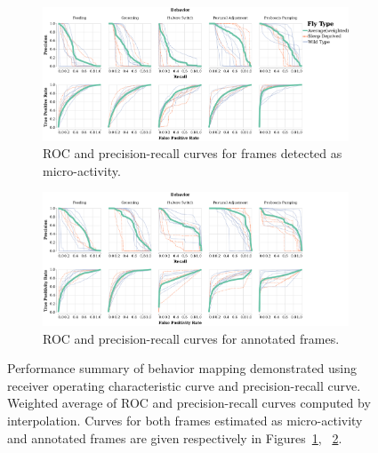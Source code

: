 \begin{figure}[htb!]
	\centering
	\begin{subfigure}[b]{0.99\linewidth}
		\centering\includegraphics[width=\linewidth]{figures/PRC_ROC-DActfiltered.pdf}
		\caption{ROC and precision-recall curves for frames detected as micro-activity. \label{figure:ROC-PRC-Act}}
	\end{subfigure}%

	\begin{subfigure}[b]{0.99\linewidth}
		\centering\includegraphics[width=\linewidth]{figures/PRC_ROC-DAnnfiltered.pdf}
		\caption{ROC and precision-recall curves for annotated frames. \label{figure:ROC-PRC-Ann}}
	\end{subfigure}%
	\caption[Performance summary of behavior mapping demonstrated using receiver operating characteristic curve and precision-recall curve.
	]{Performance summary of behavior mapping demonstrated using receiver operating characteristic curve and precision-recall curve.
		Weighted average of ROC and precision-recall curves computed by interpolation.
		Curves for both frames estimated as micro-activity and annotated frames are given respectively in Figures~\ref{figure:ROC-PRC-Act}, ~\ref{figure:ROC-PRC-Ann}. \label{figure:ROC-PRC}}
\end{figure}

